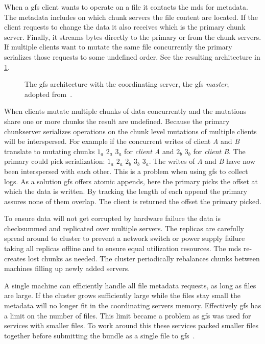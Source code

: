 When a \ac{gfs} client wants to operate on a file it contacts the \ac{mds} for metadata. The metadata includes on which chunk servers the file content are located. If the client requests to change the data it also receives which is the primary chunk server. Finally, it streams bytes directly to the primary or from the chunk servers. If multiple clients want to mutate the same file concurrently the primary serializes those requests to some undefined order. See the resulting architecture in \cref{fig:GFS_arch}.
%
\begin{figure}[htbp]
	\centering
	
	\caption{The \ac{gfs} architecture with the coordinating server, the \ac{gfs} \textit{master}, adopted from~\cite{GFS}.}
	\label{fig:GFS_arch}
\end{figure}
%
When clients mutate multiple chunks of data concurrently and the mutations share one or more chunks the result are undefined. Because the primary chunkserver serializes operations on the chunk level mutations of multiple clients will be interspersed. For example if the concurrent writes of client \textit{A} and \textit{B} translate to mutating chunks $1_a$ $2_a$ $3_a$ for \textit{client A} and $2_b$ $3_b$ for \textit{client B}. The primary could pick serialization: $1_a$ $2_a$ $2_b$ $3_b$ $3_a$. The writes of \textit{A} and \textit{B} have now been interspersed with each other. This is a problem when using \ac{gfs} to collect logs. As a solution \ac{gfs} offers atomic appends, here the primary picks the offset at which the data is written. By tracking the length of each append the primary assures none of them overlap. The client is returned the offset the primary picked.

To ensure data will not get corrupted by hardware failure the data is checksummed and replicated over multiple servers. The replicas are carefully spread around to cluster to prevent a network switch or power supply failure taking all replicas offline and to ensure equal utilization resources. The \ac{mds} re-creates lost chunks as needed. The cluster periodically rebalances chunks between machines filling up newly added servers. 

A single machine can efficiently handle all file metadata requests, as long as files are large. If the cluster grows sufficiently large while the files stay small the metadata will no longer fit in the coordinating servers memory. Effectively \ac{gfs} has a limit on the number of files. This limit became a problem as \ac{gfs} was used for services with smaller files. To work around this these services packed smaller files together before submitting the bundle as a single file to \ac{gfs}~\cite{GFS_interview}.

